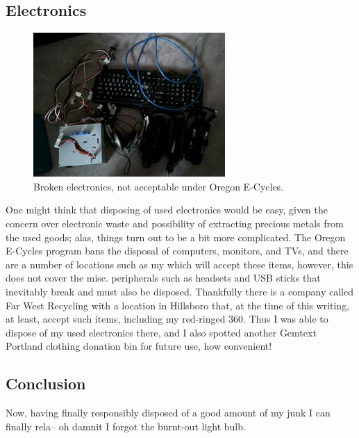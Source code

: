 \documentclass{article}
\begin{document}
\subsection{Electronics}
\begin{figure}
\includegraphics{files/blog/2018_03_15_recycling_in_hillsboro/2018_03_15_electronics.png}
\caption{Broken electronics, not acceptable under Oregon E-Cycles.}
\end{figure}
One might think that disposing of used electronics would be easy, given the concern over electronic waste and possibility of extracting precious metals from the used goods; alas, things turn out to be a bit more complicated.  The Oregon E-Cycles program bans the disposal of computers, monitors, and TVs, and there are a number of locations such as my  which will accept these items, however, this does not cover the misc. peripherals such as headsets and USB sticks that inevitably break and must also be disposed.  Thankfully there is a company called Far West Recycling with a location in Hillsboro that, at the time of this writing, at least,  accept such items, including my red-ringed 360.  Thus I was able to dispose of my used electronics there, and I also spotted another Gemtext Portland clothing donation bin for future use, how convenient!

\subsection{Conclusion}
Now, having finally responsibly disposed of a good amount of my junk I can finally rela-- oh damnit I forgot the burnt-out light bulb.


\end{document}
